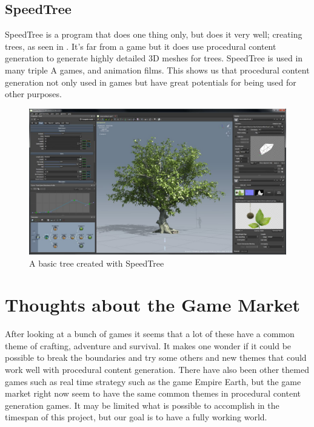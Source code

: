 \subsection{SpeedTree}

SpeedTree\cite{SpeedTree} is a program that does one thing only, but does it very well; creating trees, as seen in . It's far from a game but it does use procedural content generation to generate highly detailed 3D meshes for trees. SpeedTree is used in many triple A games, and animation films. This shows us that procedural content generation not only used in games but have great potentials for being used for other purposes.

\begin{figure}[H]
	\includegraphics[width=0.7\linewidth]{img/SpeedTree}
	\centering
	\caption{A basic tree created with SpeedTree}
	\label{fig:SpeedTree}
\end{figure}


\section{Thoughts about the Game Market}

After looking at a bunch of games it seems that a lot of these have a common theme of crafting, adventure and survival. It makes one wonder if it could be possible to break the boundaries and try some others and new themes that could work well with procedural content generation. There have also been other themed games such as real time strategy such as the game Empire Earth, but the game market right now seem to have the same common themes in procedural content generation games. It may be limited what is possible to accomplish in the timespan of this project, but our goal is to have a fully working world.
